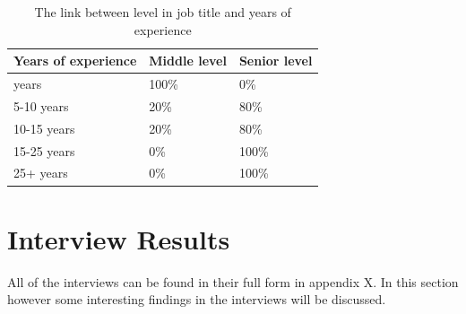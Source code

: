 \documentclass{cslthse-msc}
\begin{document}
    \begin{table}[H]
        \centering
        \caption{The link between level in job title and years of experience}
        \label{tab:experience_level}
        \begin{tabular}{|l|l|l|}
            \hline
            \textbf{Years of experience} & \textbf{Middle level} & \textbf{Senior level} \\ \hline
            \< 5 years           & 100\%         & 0\%           \\ \hline
            5-10 years        & 20\%          & 80\%          \\ \hline
            10-15 years       & 20\%          & 80\%          \\ \hline
            15-25 years       & 0\%           & 100\%         \\ \hline
            25+ years           & 0\%           & 100\%         \\ \hline
        \end{tabular}
    \end{table}

    \section{Interview Results}

    All of the interviews can be found in their full form in appendix X. In this section however
    some interesting findings in the interviews will be discussed.
\end{document}
